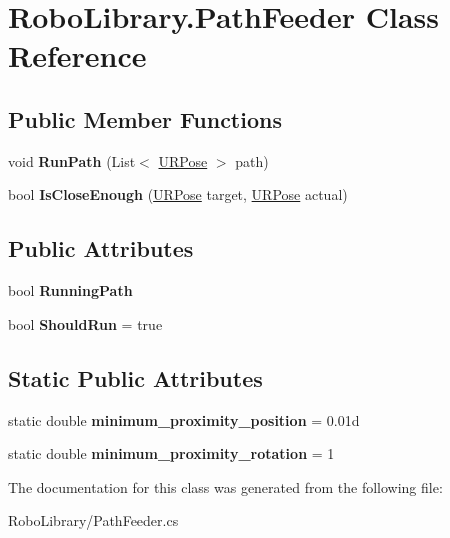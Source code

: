 \hypertarget{class_robo_library_1_1_path_feeder}{}\section{Robo\+Library.\+Path\+Feeder Class Reference}
\label{class_robo_library_1_1_path_feeder}
\subsection*{Public Member Functions}
\begin{DoxyCompactItemize}
\item 
\hypertarget{class_robo_library_1_1_path_feeder_a13726d814ab88a8950e2d2aca56e39cd}{}\label{class_robo_library_1_1_path_feeder_a13726d814ab88a8950e2d2aca56e39cd} 
void {\bfseries Run\+Path} (List$<$ \hyperlink{class_robo_library_1_1_u_r_pose}{U\+R\+Pose} $>$ path)
\item 
\hypertarget{class_robo_library_1_1_path_feeder_a0a6035a947d529023748323ffc383f4d}{}\label{class_robo_library_1_1_path_feeder_a0a6035a947d529023748323ffc383f4d} 
bool {\bfseries Is\+Close\+Enough} (\hyperlink{class_robo_library_1_1_u_r_pose}{U\+R\+Pose} target, \hyperlink{class_robo_library_1_1_u_r_pose}{U\+R\+Pose} actual)
\end{DoxyCompactItemize}
\subsection*{Public Attributes}
\begin{DoxyCompactItemize}
\item 
\hypertarget{class_robo_library_1_1_path_feeder_a0b00d377406135530dd4f8db06b1af35}{}\label{class_robo_library_1_1_path_feeder_a0b00d377406135530dd4f8db06b1af35} 
bool {\bfseries Running\+Path}
\item 
\hypertarget{class_robo_library_1_1_path_feeder_aa173e29e43684b244bb098781f69e381}{}\label{class_robo_library_1_1_path_feeder_aa173e29e43684b244bb098781f69e381} 
bool {\bfseries Should\+Run} = true
\end{DoxyCompactItemize}
\subsection*{Static Public Attributes}
\begin{DoxyCompactItemize}
\item 
\hypertarget{class_robo_library_1_1_path_feeder_a7594eb7457b5143effd224d78e650750}{}\label{class_robo_library_1_1_path_feeder_a7594eb7457b5143effd224d78e650750} 
static double {\bfseries minimum\+\_\+proximity\+\_\+position} = 0.\+01d
\item 
\hypertarget{class_robo_library_1_1_path_feeder_ac0882a60619c474f9cbf67f0bf094725}{}\label{class_robo_library_1_1_path_feeder_ac0882a60619c474f9cbf67f0bf094725} 
static double {\bfseries minimum\+\_\+proximity\+\_\+rotation} = 1
\end{DoxyCompactItemize}


The documentation for this class was generated from the following file\+:\begin{DoxyCompactItemize}
\item 
Robo\+Library/Path\+Feeder.\+cs\end{DoxyCompactItemize}
